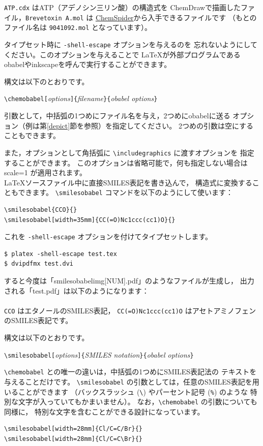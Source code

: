 \documentclass[12pt]{ltjsarticle}
\begin{document}
\verb|ATP.cdx| はATP（アデノシン三リン酸）の構造式を
ChemDrawで描画したファイル，\verb|Brevetoxin A.mol| は
\href{http://www.chemspider.com/}{ChemSpider}から入手できるファイルです
（もとのファイル名は \verb|9041092.mol| となっています）。

タイプセット時に \verb|-shell-escape| オプションを与えるのを
忘れないようにしてください。このオプションを与えることで
\LaTeX が外部プログラムであるobabelやinkscapeを呼んで実行することができます。

構文は以下のとおりです。
\begin{center}
\verb|\chemobabel[|\textit{options}\verb|]{|\textit{filename}\verb|}{|\textit{obabel options}\verb|}|
\end{center}
引数として，中括弧の1つめにファイル名を与え，2つめにobabelに送る
オプション（例は第\ref{depict}節を参照）を指定してください。
2つめの引数は空にすることもできます。

また，オプションとして角括弧に \verb|\includegraphics| に渡すオプションを
指定することができます。
このオプションは省略可能で，何も指定しない場合は scale=1 が適用されます。 \\

\LaTeX ソースファイル中に直接SMILES表記を書き込んで，
構造式に変換することもできます。
\verb|\smilesobabel| コマンドを以下のようにして使います：
\begin{verbatim}
\smilesobabel{CCO}{}
\smilesobabel[width=35mm]{CC(=O)Nc1ccc(cc1)O}{}
\end{verbatim}
これを \verb|-shell-escape| オプションを付けてタイプセットします。
\begin{verbatim}
$ platex -shell-escape test.tex
$ dvipdfmx test.dvi
\end{verbatim}
すると今度は「smilesobabelimg[NUM].pdf」のようなファイルが生成し，
出力される「test.pdf」は以下のようになります： \\
 \\
\verb|CCO| はエタノールのSMILES表記，
\verb|CC(=O)Nc1ccc(cc1)O| はアセトアミノフェンのSMILES表記です。

構文は以下のとおりです。
\begin{center}
\verb|\smilesobabel[|\textit{options}\verb|]{|\textit{SMILES notation}\verb|}{|\textit{obabel options}\verb|}|
\end{center}
\verb|\chemobabel| との唯一の違いは，中括弧の1つめにSMILES表記法の
テキストを与えることだけです。
\verb|\smilesobabel| の引数としては，任意のSMILES表記を用いることができます
（バックスラッシュ (\verb|\|) やパーセント記号 (\verb|%|) のような
特別な文字が入っていてもかまいません）。
なお，\verb|\chemobabel| の引数についても同様に，
特別な文字を含むことができる設計になっています。
\begin{verbatim}
\smilesobabel[width=28mm]{Cl/C=C/Br}{}
\smilesobabel[width=28mm]{Cl/C=C\Br}{}
\end{verbatim}
\end{document}
